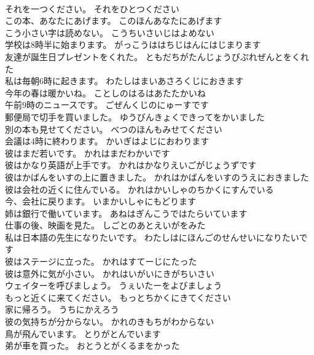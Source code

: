 \documentclass[8pt]{extreport}
\begin{document}
\begin{CJK}{UTF8}{min}
\\	それを一つください。	それをひとつください 
\\	この本、あなたにあげます。	このほんあなたにあげます 
\\	こう小さい字は読めない。	こうちいさいじはよめない 
\\	学校は8時半に始まります。	がっこうははちじはんにはじまります 
\\	友達が誕生日プレゼントをくれた。	ともだちがたんじょうびぷれぜんとをくれた 
\\	私は毎朝6時に起きます。	わたしはまいあさろくじにおきます 
\\	今年の春は暖かいね。	ことしのはるはあたたかいね 
\\	午前9時のニュースです。	ごぜんくじのにゅーすです 
\\	郵便局で切手を買いました。	ゆうびんきょくできってをかいました 
\\	別の本も見せてください。	べつのほんもみせてください 
\\	会議は4時に終わります。	かいぎはよじにおわります 
\\	彼はまだ若いです。	かれはまだわかいです 
\\	彼はかなり英語が上手です。	かれはかなりえいごがじょうずです 
\\	彼はかばんをいすの上に置きました。	かれはかばんをいすのうえにおきました 
\\	彼は会社の近くに住んでいる。	かれはかいしゃのちかくにすんでいる 
\\	今、会社に戻ります。	いまかいしゃにもどります 
\\	姉は銀行で働いています。	あねはぎんこうではたらいています 
\\	仕事の後、映画を見た。	しごとのあとえいがをみた 
\\	私は日本語の先生になりたいです。	わたしはにほんごのせんせいになりたいです 
\\	彼はステージに立った。	かれはすてーじにたった 
\\	彼は意外に気が小さい。	かれはいがいにきがちいさい 
\\	ウェイターを呼びましょう。	うぇいたーをよびましょう 
\\	もっと近くに来てください。	もっとちかくにきてください 
\\	家に帰ろう。	うちにかえろう 
\\	彼の気持ちが分からない。	かれのきもちがわからない 
\\	鳥が飛んでいます。	とりがとんでいます 
\\	弟が車を買った。	おとうとがくるまをかった 

\end{CJK}
\end{document}
